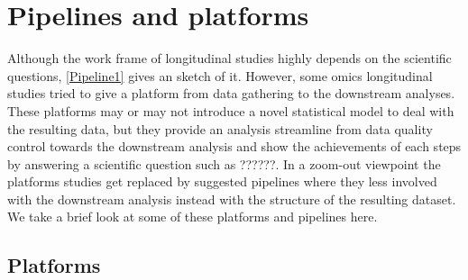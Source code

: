 \documentclass[]{article}
\begin{document}
		\section{Pipelines and platforms}
		Although the work frame of longitudinal studies highly depends on the scientific questions, \autoref{Pipeline1} gives an sketch of it. However, some omics longitudinal studies tried to give a platform from data gathering to the downstream analyses. These platforms may or may not introduce a novel statistical model to deal with the resulting data, but they provide an analysis streamline from data quality control towards the downstream analysis and show the achievements of each steps by answering a scientific question such as ??????. In a zoom-out viewpoint the platforms studies get replaced by suggested pipelines where they less involved with the downstream analysis instead with the structure of the resulting dataset. We take a brief look at some of these platforms and pipelines here. 
		\subsection{Platforms}
\end{document}
